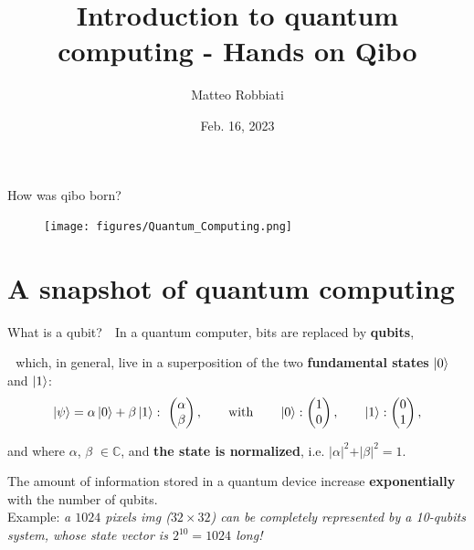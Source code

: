 \documentclass[8pt, xcolor={svgnames}, hyperref={colorlinks,linkcolor=black, citecolor=amethyst, urlcolor=amethyst}]{beamer}
\title{Introduction to quantum computing - Hands on Qibo}
\date{Feb. 16, 2023}
\author[Matteo Robbiati]{Matteo Robbiati}
\begin{document}
\maketitle

\begin{frame}{How was qibo born?}
    \begin{figure}  
    \texttt{[image: figures/Quantum\_Computing.png]}
    \end{figure}
    \vspace{-0.5cm}
\end{frame}

\section{A snapshot of quantum computing}

\begin{frame}{What is a qubit?}
\large
\faArrowCircleRight\,\, In a quantum computer, bits are replaced by \textbf{qubits},
\pause

\faArrowCircleRight\,\, which, in general, live in a superposition of 
the two \textbf{fundamental states} $\ket{0}$ and $\ket{1}$:
\begin{equation*}
    \ket{\psi} = \alpha \ket{0} + \beta \ket{1}: \,\,
    \begin{pmatrix} 
    \alpha \\ 
    \beta 
    \end{pmatrix}, \qquad \text{with} \qquad     
    \ket{0}:
    \begin{pmatrix} 
    1 \\ 
    0  
    \end{pmatrix}, \qquad \ket{1}:
    \begin{pmatrix} 
    0 \\ 
    1 
    \end{pmatrix}, 
\end{equation*}

and where $\alpha$, $\beta$ $\in \mathbb{C}$, and \textbf{the state is normalized}, i.e. $
    \vert \alpha \vert^2 + \vert \beta \vert^2 = 1.
$   
\pause
\vspace{0.8cm}
\begin{tcolorbox}[colback=amethyst!30, title=Storage advantage]
  The amount of information stored in a quantum device increase \textbf{exponentially}
  with the number of qubits. \\
  
  Example: \textit{a $1024$ pixels img ($32 \times 32$) can be completely represented 
  by a 10-qubits system, whose state vector is $2^{10}=1024$ long!}
\end{tcolorbox}
\end{frame}
\end{document}

